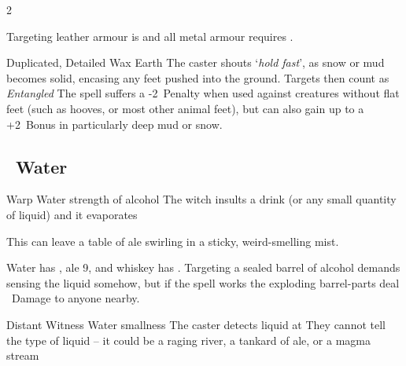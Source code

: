\begin{multicols}{2}
{{    Targeting leather armour is \tn[8] and all metal armour requires \tn[12].}

  \setcounter{diceNo}{0}


    {Duplicated, Detailed}%
    {Wax}%
    {Earth}%
    {}%
    {The caster shouts `\textit{hold fast}', as snow or mud becomes solid, encasing any feet pushed into the ground.
    Targets then count as \textit{Entangled}}%
    {
    The spell suffers a -2~Penalty when used against creatures without flat feet (such as hooves, or most other animal feet), but can also gain up to a +2~Bonus in particularly deep mud or snow.}



}

\subsection[Water]{~Water}
\label{waterSpells}

  {}%
  {Warp}%
  {Water}%
  {strength of alcohol}%
  {The \gls{witch} insults a drink (or any small quantity of liquid) and it evaporates}%
  {This can leave a table of ale swirling in a sticky, weird-smelling mist.

  Water has \tn[7], ale 9, and whiskey has \tn[11].
  Targeting a sealed barrel of alcohol demands sensing the liquid somehow, but if the spell works the exploding barrel-parts deal \showDam~Damage to anyone nearby.}


\setcounter{diceNo}{0}


\setcounter{diceNo}{1}

  {Distant}%
  {Witness}%
  {Water}%
  {smallness}%
  {The caster detects liquid at \spellRange}%
  {They cannot tell the type of liquid -- it could be a raging river, a tankard of ale, or a magma stream}





\end{multicols}
